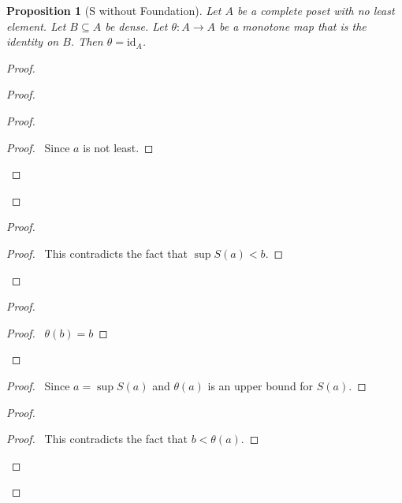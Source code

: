 \documentclass{book}
\let\qed\relax
\newtheorem{prop}[ax]{Proposition}
\theoremstyle{definition}
\begin{document}
\begin{prop}[S without Foundation]
\label{prop:orderisoid}
Let $A$ be a complete poset with no least element. Let $B \subseteq A$ be dense. Let $\theta : A \rightarrow A$ be a monotone map that is the identity on $B$. Then $\theta = \mathrm{id}_A$.
\end{prop}

\begin{proof}
\pf
{}
\begin{proof}
	\begin{proof}
		\begin{proof}
			\pf\ Since $a$ is not least.
		\end{proof}
	\end{proof}
\end{proof}
\begin{proof}
	\qedstep
	\begin{proof}
		\pf\ This contradicts the fact that $\sup S(a) < b$.
	\end{proof}
\end{proof}
\begin{proof}
	\begin{proof}
		\pf\ $\theta(b) = b$
	\end{proof}
\end{proof}
\begin{proof}
	\pf\ Since $a = \sup S(a)$ and $\theta(a)$ is an upper bound for $S(a)$.
\end{proof}
\begin{proof}
	\qedstep
	\begin{proof}
		\pf\ This contradicts the fact that $b < \theta(a)$.
	\end{proof}
\end{proof}
\qed
\end{proof}
\end{document}
